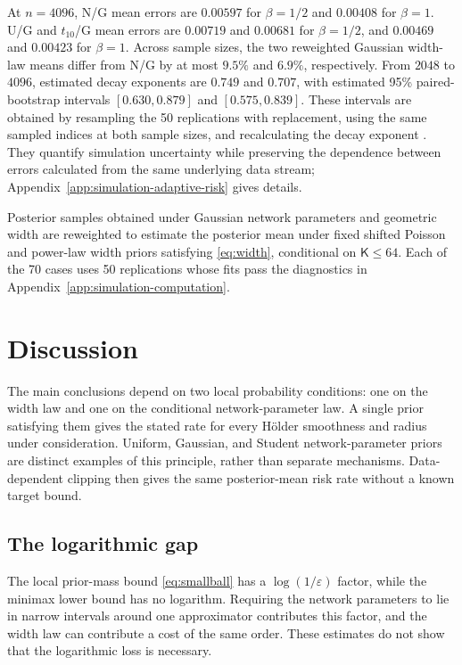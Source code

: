 \documentclass[11pt,a4paper]{article}
\theoremstyle{remark}
\begin{document}
{At $n=4096$, N/G mean errors are $0.00597$ for $\beta=1/2$ and $0.00408$ for $\beta=1$. U/G and $t_{10}$/G mean errors are $0.00719$ and $0.00681$ for $\beta=1/2$, and $0.00469$ and $0.00423$ for $\beta=1$. Across sample sizes, the two reweighted Gaussian width-law means differ from N/G by at most $9.5\%$ and $6.9\%$, respectively. From $2048$ to $4096$, estimated decay exponents are $0.749$ and $0.707$, with estimated 95\% paired-bootstrap intervals $[0.630,0.879]$ and $[0.575,0.839]$.
These intervals are obtained by resampling the 50 replications with
replacement, using the same sampled indices at both sample sizes, and
recalculating the decay exponent \citep{efron1985bootstrap}. They quantify simulation uncertainty
while preserving the dependence between errors calculated from the same
underlying data stream; Appendix~\ref{app:simulation-adaptive-risk}
gives details.}

Posterior samples obtained under Gaussian network parameters and
geometric width are reweighted to estimate the posterior mean under fixed
shifted Poisson and power-law width priors satisfying \eqref{eq:width},
conditional on $\mathsf K\leq64$. Each of the 70 cases uses 50 replications whose fits pass the diagnostics
in Appendix~\ref{app:simulation-computation}.


\section{Discussion}

The main conclusions depend on two local probability conditions:
one on the width law and one on the conditional network-parameter law. A single
prior satisfying them gives the stated rate for every H\"older
smoothness and radius under consideration. Uniform, Gaussian, and
Student network-parameter priors are distinct examples of this principle, rather than
separate mechanisms. Data-dependent clipping then gives the same
posterior-mean risk rate without a known target bound.

\subsection{The logarithmic gap}\label{sec:log-gap}

The local prior-mass bound \eqref{eq:smallball} has a
$\log(1/\varepsilon)$ factor, while the minimax lower bound has
no logarithm. Requiring the network parameters to lie in narrow intervals
around one approximator contributes this factor, and the width law
can contribute a cost of the same order. These estimates do not
show that the logarithmic loss is necessary.
\end{document}
